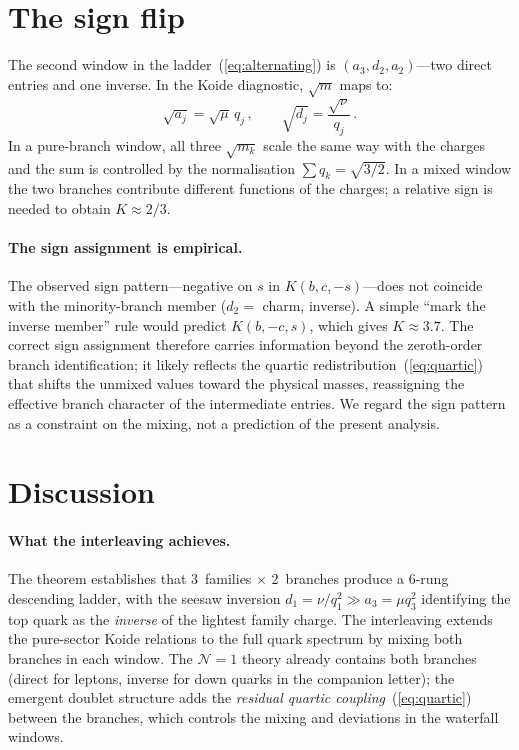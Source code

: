 \documentclass[preprint,12pt]{elsarticle}
\begin{document}
\section{The sign flip}
\label{sec:sign}

The second window in the
ladder~(\ref{eq:alternating}) is
$(a_3, d_2, a_2)$---two direct entries and one inverse.
In the Koide diagnostic, $\sqrt{m}$ maps to:
\begin{equation}
  \sqrt{a_j} = \sqrt{\mu}\,q_j\,,\qquad
  \sqrt{d_j} = \frac{\sqrt{\nu}}{q_j}\,.
  \label{eq:sqrt_branches}
\end{equation}
In a pure-branch window, all three $\sqrt{m_k}$ scale the
same way with the charges and the sum is controlled by
the normalisation $\sum q_k = \sqrt{3/2}$.
In a mixed window the two branches contribute different
functions of the charges; a relative sign is needed
to obtain $K \approx 2/3$.

\paragraph{The sign assignment is empirical.}
The observed sign pattern---negative on $s$ in
$K(b, c, -s)$---does not coincide with the
minority-branch member ($d_2 = $ charm, inverse).
A simple ``mark the inverse member'' rule would
predict $K(b, -c, s)$, which gives $K \approx 3.7$.
The correct sign assignment therefore carries
information beyond the zeroth-order branch
identification; it likely reflects the
quartic redistribution~(\ref{eq:quartic}) that
shifts the unmixed values toward the physical
masses, reassigning the effective branch character
of the intermediate entries.
We regard the sign pattern as a constraint on the
mixing, not a prediction of the present analysis.

\section{Discussion}
\label{sec:discussion}

\paragraph{What the interleaving achieves.}
The theorem establishes that 3~families $\times$ 2~branches
produce a 6-rung descending ladder, with the seesaw
inversion $d_1 = \nu/q_1^2 \gg a_3 = \mu q_3^2$
identifying the top quark as the \emph{inverse} of the lightest
family charge.  The interleaving extends the pure-sector
Koide relations to the full quark spectrum by mixing
both branches in each window.  The $\mathcal{N}{=}1$ theory already contains both branches
(direct for leptons, inverse for down quarks in the companion
letter); the emergent doublet structure adds the
\emph{residual quartic coupling}~(\ref{eq:quartic}) between
the branches, which controls the mixing and deviations
in the waterfall windows.
\end{document}
